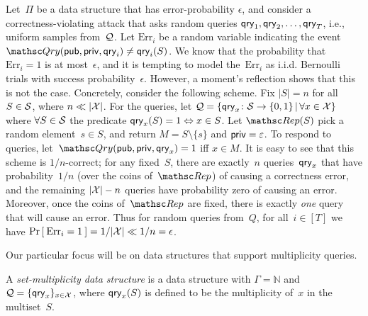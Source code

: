 Let~$\Pi$ be a data structure that has error-probability $\epsilon$,
and consider a correctness-violating attack that asks random
queries $\mathsf{qry}_1,\mathsf{qry}_2,\ldots,\mathsf{qry}_T$, i.e., uniform samples from~${\cal Q}$.
Let $\mathrm{Err}_i$ be a random variable indicating the event
$\Qry(\pubaux,\privaux,\qry_i)\neq \qry_i(S)$.  We know that the probability
that $\mathrm{Err}_i=1$ is at most~$\epsilon$, and it is tempting to
model the~$\mathrm{Err}_i$ as i.i.d. Bernoulli trials with success
probability~$\epsilon$. However, a moment's reflection shows that
this is not the case.  Concretely, consider the following scheme.
Fix $|S|=n$ for all $S \in {\cal S}$, where $n \ll |{\cal X}|$. For the
queries, let ${\cal Q} = \{\mathsf{qry}_x\colon {\cal S} \to \{0,1\} \,|\, \forall x
\in {\cal X}\}$ where $\forall S \in {\cal S}$ the predicate $\mathsf{qry}_x(S)=1
\Leftrightarrow x \in S$.  Let $\Rep(S)$ pick a random element~$s
\in S$, and return $M = S \setminus \{s\}$ and ${\sf priv} =
\varepsilon$.  To respond to queries,
let~$\Qry(\pubaux,\privaux,\qry_x)=1$ iff $x \in M$.  It is easy to see
that this scheme is $1/n$-correct; for any fixed~$S$, there are
exactly~$n$ queries~$\mathsf{qry}_x$ that have probability~$1/n$  (over the
coins of~$\Rep$) of causing a correctness error, and the remaining
$|{\cal X}|-n$ queries have probability zero of causing an error.
Moreover, once the coins of~$\Rep$ are fixed, there is exactly
\emph{one} query that will cause an error.  Thus for random queries
from~$Q$, for all~$i\in[T]$ we have
$\Pr\left[\: \mathrm{Err}_i=1 \:\right]=1/|{\cal X}| \ll 1/n = \epsilon$.


 Our
particular focus will be on data structures that support
multiplicity queries.

\begin{definition} \rm
A \emph{set-multiplicity data structure} is a data structure with
$\Gamma=\mathbb{N}$ and ${\cal Q}=\{\mathsf{qry}_x\}_{x \in {\cal X}}$, where
$\mathsf{qry}_x(S)$ is defined to be the multiplicity of~$x$ in the
multiset~$S$. \hfill\dqed
\end{definition}

